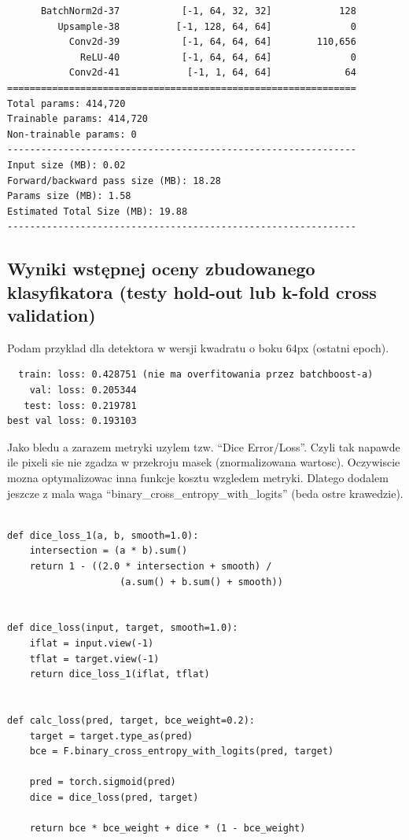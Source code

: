 \documentclass{bmvc2k}
\begin{document}
\begin{verbatim}
      BatchNorm2d-37           [-1, 64, 32, 32]            128
         Upsample-38          [-1, 128, 64, 64]              0
           Conv2d-39           [-1, 64, 64, 64]        110,656
             ReLU-40           [-1, 64, 64, 64]              0
           Conv2d-41            [-1, 1, 64, 64]             64
==============================================================
Total params: 414,720
Trainable params: 414,720
Non-trainable params: 0
--------------------------------------------------------------
Input size (MB): 0.02
Forward/backward pass size (MB): 18.28
Params size (MB): 1.58
Estimated Total Size (MB): 19.88
--------------------------------------------------------------
\end{verbatim}

\subsection{Wyniki wstępnej oceny zbudowanego klasyfikatora (testy hold-out lub k-fold cross validation)}

Podam przyklad dla detektora w wersji kwadratu o boku 64px (ostatni epoch).

\begin{verbatim}
  train: loss: 0.428751 (nie ma overfitowania przez batchboost-a)
    val: loss: 0.205344
   test: loss: 0.219781
best val loss: 0.193103
\end{verbatim}

Jako bledu a zarazem metryki uzylem tzw. ``Dice Error/Loss''. Czyli tak napawde ile
pixeli sie nie zgadza w przekroju masek (znormalizowana wartosc). Oczywiscie
mozna optymalizowac inna
funkcje kosztu wzgledem metryki. Dlatego dodalem jeszcze z mala waga
``binary\_cross\_entropy\_with\_logits'' (beda ostre krawedzie).

\begin{verbatim}

def dice_loss_1(a, b, smooth=1.0):
    intersection = (a * b).sum()
	return 1 - ((2.0 * intersection + smooth) /
	                (a.sum() + b.sum() + smooth))


def dice_loss(input, target, smooth=1.0):
    iflat = input.view(-1)
    tflat = target.view(-1)
    return dice_loss_1(iflat, tflat)


def calc_loss(pred, target, bce_weight=0.2):
    target = target.type_as(pred)
    bce = F.binary_cross_entropy_with_logits(pred, target)

    pred = torch.sigmoid(pred)
    dice = dice_loss(pred, target)

    return bce * bce_weight + dice * (1 - bce_weight)
\end{verbatim}
\end{document}

